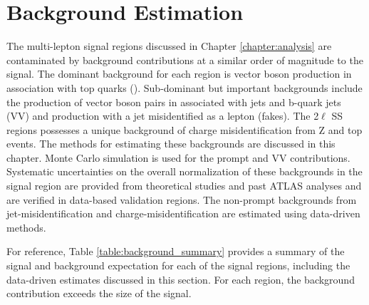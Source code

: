 \chapter[Background Estimation][Background Estimation]{Background Estimation}
\label{chapter:background}

The \tth multi-lepton signal regions discussed in Chapter \ref{chapter:analysis} are contaminated by background contributions at a similar order of magnitude to the signal. The dominant background for each region is vector boson production in association with top quarks (\ttV). Sub-dominant but important backgrounds include the production of vector boson pairs in associated with jets and b-quark jets (VV) and \ttbar production with a jet misidentified as a lepton (fakes). The 2$\ell$ SS regions possesses a unique background of charge misidentification from Z and top events. The methods for estimating these backgrounds are discussed in this chapter. Monte Carlo simulation is used for the prompt \ttV and VV contributions. Systematic uncertainties on the overall normalization of these backgrounds in the signal region are provided from theoretical studies and past ATLAS analyses and are verified in data-based validation regions. The non-prompt backgrounds from \ttbar jet-misidentification and charge-misidentification are estimated using data-driven methods. 

For reference, Table \ref{table:background_summary} provides a summary of the \tth signal and background expectation for each of the signal regions, including the data-driven estimates discussed in this section. For each region, the background contribution exceeds the size of the signal. 


